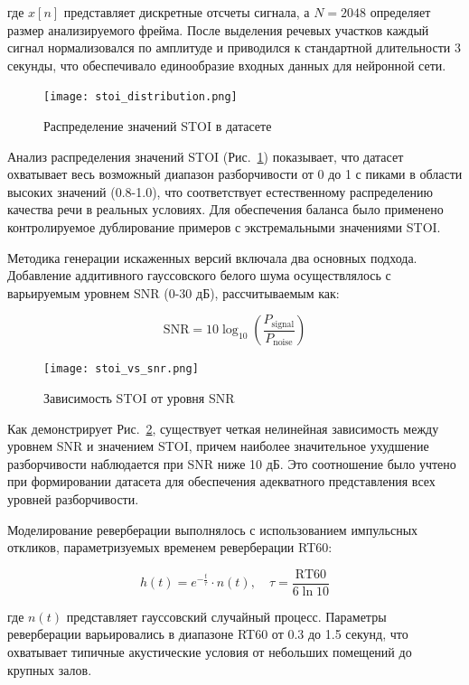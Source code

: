 \documentclass[oneside, final, 14pt]{extarticle}
\begin{document}
где $x[n]$ представляет дискретные отсчеты сигнала, а $N=2048$ определяет размер анализируемого фрейма. После выделения речевых участков каждый сигнал нормализовался по амплитуде и приводился к стандартной длительности 3 секунды, что обеспечивало единообразие входных данных для нейронной сети.

\begin{figure}[h]
	\centering
	\texttt{[image: stoi\_distribution.png]}
	\caption{Распределение значений STOI в датасете}
	\label{fig:stoi_dist}
\end{figure}

Анализ распределения значений STOI (Рис.~\ref{fig:stoi_dist}) показывает, что датасет охватывает весь возможный диапазон разборчивости от 0 до 1 с пиками в области высоких значений (0.8-1.0), что соответствует естественному распределению качества речи в реальных условиях. Для обеспечения баланса было применено контролируемое дублирование примеров с экстремальными значениями STOI.

Методика генерации искаженных версий включала два основных подхода. Добавление аддитивного гауссовского белого шума осуществлялось с варьируемым уровнем SNR (0-30 дБ), рассчитываемым как:

\begin{equation}
	\text{SNR} = 10\log_{10}\left(\frac{P_{\text{signal}}}{P_{\text{noise}}}\right)
\end{equation}

\begin{figure}[]
	\centering
	\texttt{[image: stoi\_vs\_snr.png]}
	\caption{Зависимость STOI от уровня SNR}
	\label{fig:stoi_snr}
\end{figure}

Как демонстрирует Рис.~\ref{fig:stoi_snr}, существует четкая нелинейная зависимость между уровнем SNR и значением STOI, причем наиболее значительное ухудшение разборчивости наблюдается при SNR ниже 10 дБ. Это соотношение было учтено при формировании датасета для обеспечения адекватного представления всех уровней разборчивости.

Моделирование реверберации выполнялось с использованием импульсных откликов, параметризуемых временем реверберации RT60:

\begin{equation}
	h(t) = e^{-\frac{t}{\tau}}\cdot n(t), \quad \tau = \frac{\text{RT60}}{6\ln10}
\end{equation}

где $n(t)$ представляет гауссовский случайный процесс. Параметры реверберации варьировались в диапазоне RT60 от 0.3 до 1.5 секунд, что охватывает типичные акустические условия от небольших помещений до крупных залов.
\end{document}
